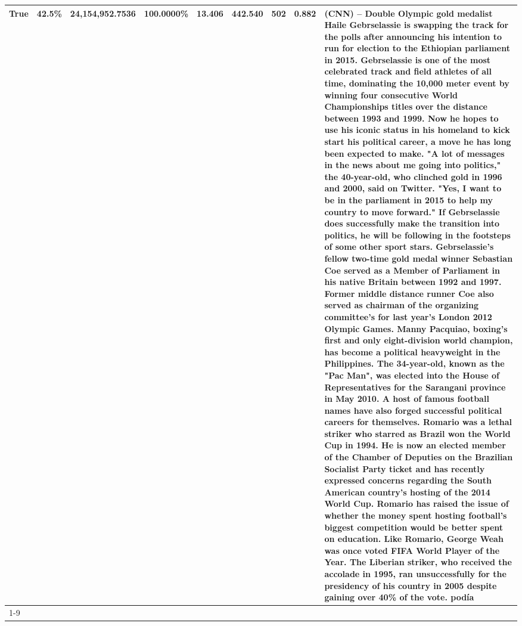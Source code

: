 \begin{table}[H]
{\begin{tabular}{lllrlllll}
True & 42.5\% & 24,154,952.7536 & \bfseries \color{red} 100.0000\% & 13.406 & 442.540 & 502 & 0.882 & (CNN) -- Double Olympic gold medalist Haile Gebrselassie is swapping the track for the polls after announcing his intention to run for election to the Ethiopian parliament in 2015. Gebrselassie is one of the most celebrated track and field athletes of all time, dominating the 10,000 meter event by winning four consecutive World Championships titles over the distance between 1993 and 1999. Now he hopes to use his iconic status in his homeland to kick start his political career, a move he has long been expected to make. "A lot of messages in the news about me going into politics," the 40-year-old, who clinched gold in 1996 and 2000, said on Twitter. "Yes, I want to be in the parliament in 2015 to help my country to move forward." If Gebrselassie does successfully make the transition into politics, he will be following in the footsteps of some other sport stars. Gebrselassie's fellow two-time gold medal winner Sebastian Coe served as a Member of Parliament in his native Britain between 1992 and 1997. Former middle distance runner Coe also served as chairman of the organizing committee's for last year's London 2012 Olympic Games. Manny Pacquiao, boxing's first and only eight-division world champion, has become a political heavyweight in the Philippines. The 34-year-old, known as the "Pac Man", was elected into the House of Representatives for the Sarangani province in May 2010. A host of famous football names have also forged successful political careers for themselves. Romario was a lethal striker who starred as Brazil won the World Cup in 1994. He is now an elected member of the Chamber of Deputies on the Brazilian Socialist Party ticket and has recently expressed concerns regarding the South American country's hosting of the 2014 World Cup. Romario has raised the issue of whether the money spent hosting football's biggest competition would be better spent on education. Like Romario, George Weah was once voted FIFA World Player of the Year. The Liberian striker, who received the accolade in 1995, ran unsuccessfully for the presidency of his country in 2005 despite gaining over 40\% of the vote. podía \\
\cline{1-9}

\end{tabular}}
\end{table}
